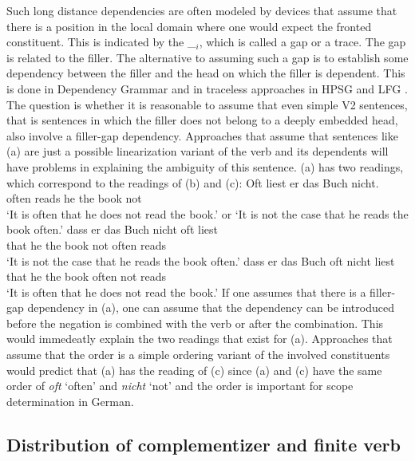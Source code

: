 Such long distance dependencies are often modeled by devices that assume that there is a position in
the local domain where one would expect the fronted constituent. This is indicated by the \_$_i$,
which is called a gap or a trace. The gap is related to the filler. The alternative to assuming such a gap is
to establish some dependency between the filler and the head on which the filler is dependent. This
is done in Dependency Grammar \citep{Hudson2000a} and in traceless approaches in HPSG
\citep*{BMS2001a} and LFG \citep{KZ89a}. The question is whether
it is reasonable to assume that even simple V2 sentences, that is sentences in which the filler does
not belong to a deeply embedded head, also involve a filler-gap dependency. Approaches that assume
that sentences like (a) are just a possible linearization variant of the verb and its
dependents will have problems in explaining the ambiguity of this sentence. (a) has two
readings, which correspond to the readings of (b) and (c):
\eal
\ex\label{ex-oft-liest-er-das-buch-nicht} 
\gll Oft liest er das Buch nicht.\\
     often reads he the book not\\
\glt `It is often that he does not read the book.' or `It is not the case that he reads the book
often.'
\ex
\gll dass er das Buch nicht oft liest\\
     that he the book not often reads\\
\glt `It is not the case that he reads the book often.'
\ex
\gll dass er das Buch oft nicht liest\\
     that he the book often not reads\\
\glt `It is often that he does not read the book.'
\zl
If one assumes that there is a filler-gap dependency in (a), one can assume that the
dependency can be introduced before the negation is combined with the verb or after the
combination. This would immedeatly explain the two readings that exist for (a). Approaches
that assume that the order is a simple ordering variant of the involved constituents would predict
that (a) has the reading of (c) since (a) and (c) have the same order of
\emph{oft} `often' and \emph{nicht} `not' and the order is important for scope determination in German.

\subsection{Distribution of complementizer and finite verb}


